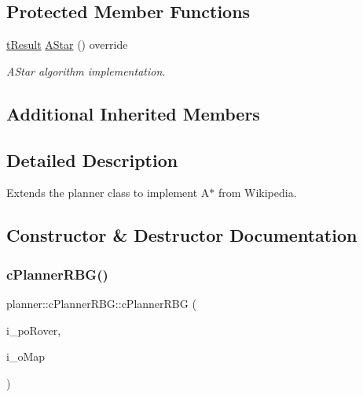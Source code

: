 \subsection*{Protected Member Functions}
\begin{DoxyCompactItemize}
\item 
\mbox{\hyperlink{structt_result}{t\+Result}} \mbox{\hyperlink{classplanner_1_1c_planner_r_b_g_affd7011ef4df878a8e95ecf7f42c8e6f}{A\+Star}} () override
\begin{DoxyCompactList}\small\item\em A\+Star algorithm implementation. \end{DoxyCompactList}\end{DoxyCompactItemize}
\subsection*{Additional Inherited Members}


\subsection{Detailed Description}
Extends the planner class to implement A$\ast$ from Wikipedia. 

\subsection{Constructor \& Destructor Documentation}
\mbox{\label{classplanner_1_1c_planner_r_b_g_a91296b98e64effc16f38e2430746d94d}} 
\subsubsection{\texorpdfstring{c\+Planner\+R\+B\+G()}{cPlannerRBG()}}
{\footnotesize\ttfamily planner\+::c\+Planner\+R\+B\+G\+::c\+Planner\+R\+BG (\begin{DoxyParamCaption}\item[{std\+::shared\+\_\+ptr$<$ \mbox{\hyperlink{classplanner_1_1c_rover_interface}{c\+Rover\+Interface}}$<$ 8 $>$$>$}]{i\+\_\+po\+Rover,  }\item[{std\+::shared\+\_\+ptr$<$ \mbox{\hyperlink{classplanner_1_1c_graph}{c\+Graph}} $>$}]{i\+\_\+o\+Map }\end{DoxyParamCaption})}



